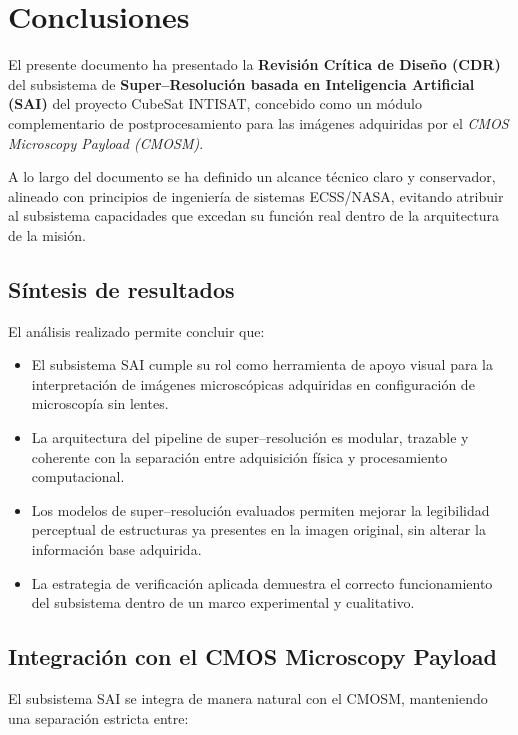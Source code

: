 \chapter{Conclusiones}
\label{ch:conclusiones}

El presente documento ha presentado la \textbf{Revisión Crítica de Diseño (CDR)}
del subsistema de \textbf{Super--Resolución basada en Inteligencia Artificial
(SAI)} del proyecto CubeSat INTISAT, concebido como un módulo complementario de
postprocesamiento para las imágenes adquiridas por el \textit{CMOS Microscopy
Payload (CMOSM)}.

A lo largo del documento se ha definido un alcance técnico claro y conservador,
alineado con principios de ingeniería de sistemas ECSS/NASA, evitando atribuir
al subsistema capacidades que excedan su función real dentro de la arquitectura
de la misión.

\section{Síntesis de resultados}

El análisis realizado permite concluir que:

\begin{itemize}
    \item El subsistema SAI cumple su rol como herramienta de apoyo visual para la
    interpretación de imágenes microscópicas adquiridas en configuración de
    microscopía sin lentes.
    \item La arquitectura del pipeline de super--resolución es modular, trazable
    y coherente con la separación entre adquisición física y procesamiento
    computacional.
    \item Los modelos de super--resolución evaluados permiten mejorar la
    legibilidad perceptual de estructuras ya presentes en la imagen original,
    sin alterar la información base adquirida.
    \item La estrategia de verificación aplicada demuestra el correcto
    funcionamiento del subsistema dentro de un marco experimental y
    cualitativo.
\end{itemize}

\section{Integración con el CMOS Microscopy Payload}

El subsistema SAI se integra de manera natural con el CMOSM, manteniendo una
separación estricta entre:

